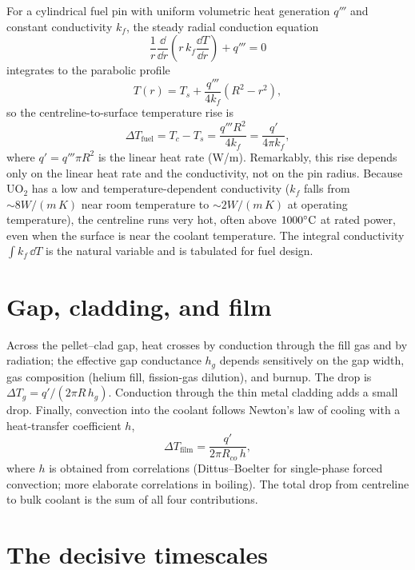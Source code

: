 For a cylindrical fuel pin with uniform volumetric heat generation $q'''$ and
constant conductivity $k_f$, the steady radial conduction equation
\begin{equation}
\frac{1}{r}\frac{\dd}{\dd r}\!\left(r\,k_f\frac{\dd T}{\dd r}\right) + q''' = 0
\end{equation}
integrates to the parabolic profile
\begin{equation}
T(r) = T_s + \frac{q'''}{4k_f}\!\left(R^2 - r^2\right),
\end{equation}
so the centreline-to-surface temperature rise is
\begin{equation}
\Delta T_{\text{fuel}} = T_c - T_s = \frac{q'''R^2}{4k_f} = \frac{q'}{4\pi k_f},
\end{equation}
where $q'=q'''\pi R^2$ is the linear heat rate (W/m). Remarkably, this rise
depends only on the linear heat rate and the conductivity, not on the pin radius.
Because $\mathrm{UO_2}$ has a low and temperature-dependent conductivity
($k_f$ falls from $\sim 8\unit{W/(m\,K)}$ near room temperature to
$\sim 2\unit{W/(m\,K)}$ at operating temperature), the centreline runs very hot,
often above $1000^{\circ}\mathrm{C}$ at rated power, even when the surface is near the coolant
temperature. The integral conductivity $\int k_f\,\dd T$ is the natural variable
and is tabulated for fuel design.

\section{Gap, cladding, and film}

Across the pellet--clad gap, heat crosses by conduction through the fill gas and
by radiation; the effective gap conductance $h_g$ depends sensitively on the gap
width, gas composition (helium fill, fission-gas dilution), and burnup. The drop
is $\Delta T_g = q'/(2\pi R\, h_g)$. Conduction through the thin metal cladding
adds a small drop. Finally, convection into the coolant follows Newton's law of
cooling with a heat-transfer coefficient $h$,
\begin{equation}
\Delta T_{\text{film}} = \frac{q'}{2\pi R_{co}\, h},
\end{equation}
where $h$ is obtained from correlations (Dittus--Boelter for single-phase forced
convection; more elaborate correlations in boiling). The total drop from
centreline to bulk coolant is the sum of all four contributions.

\section{The decisive timescales}

